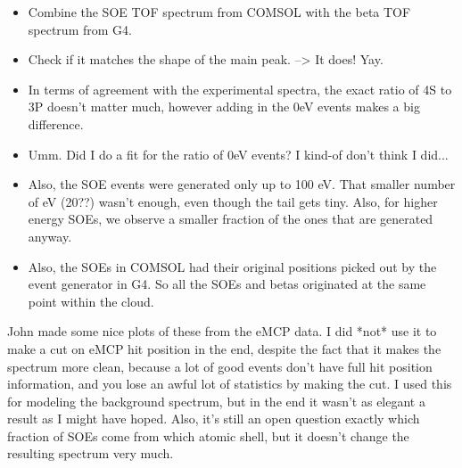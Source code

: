 \begin{itemize}
	\item Combine the SOE TOF spectrum from COMSOL with the beta TOF spectrum from G4.  
	\item Check if it matches the shape of the main peak. --> It does!  Yay.  
	\item In terms of agreement with the experimental spectra, the exact ratio of 4S to 3P doesn't matter much, however adding in the 0eV events makes a big difference.   
	\item Umm.  Did I do a fit for the ratio of 0eV events?  I kind-of don't think I did... 
	\item Also, the SOE events were generated only up to 100 eV.  That smaller number of eV (20??) wasn't enough, even though the tail gets tiny.  Also, for higher energy SOEs, we observe a smaller fraction of the ones that are generated anyway.  
	\item Also, the SOEs in COMSOL had their original positions picked out by the event generator in G4.  So all the SOEs and betas originated at the same point within the cloud.
\end{itemize}


John made some nice plots of these from the eMCP data.  I did *not* use it to make a cut on eMCP hit position in the end, despite the fact that it makes the spectrum more clean, because a lot of good events don't have full hit position information, and you lose an awful lot of statistics by making the cut.  I used this for modeling the background spectrum, but in the end it wasn't as elegant a result as I might have hoped.  Also, it's still an open question exactly which fraction of SOEs come from which atomic shell, but it doesn't change the resulting spectrum very much.

